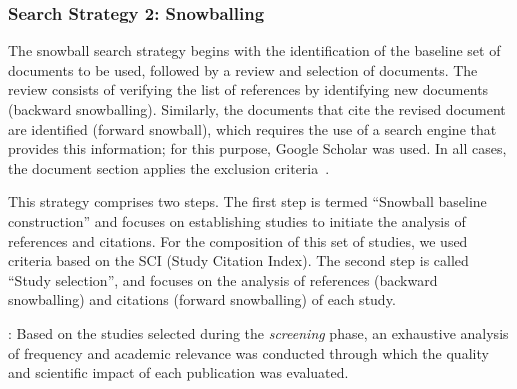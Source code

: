 \subsubsection{Search Strategy 2: Snowballing}

\newcommand{\csiSelected}{24} %
\newcommand{\newSnowballStudies}{3} %
\newcommand{\firstBackwardSnowballStudies}{3} %
\newcommand{\firstForwardSnowballStudies}{4} %
\newcommand{\secondBackwardSnowballStudies}{3} %
\newcommand{\secondForwardSnowballStudies}{5} %

\newcommand{\firstSnowballIterationStudies}{\fpeval{\firstBackwardSnowballStudies+\firstForwardSnowballStudies}}
\newcommand{\secondSnowballIterationStudies}{\fpeval{\secondBackwardSnowballStudies+\secondForwardSnowballStudies}}

\newcommand{\snowballNewStudies}{\fpeval{\firstSnowballIterationStudies+\secondSnowballIterationStudies}}




The snowball search strategy begins with the identification of the baseline set of documents to be used, followed by a review and selection of documents. The review consists of verifying the list of references by identifying new documents (backward snowballing). Similarly, the documents that cite the revised document are identified (forward snowball), which requires the use of a search engine that provides this information; for this purpose, Google Scholar was used. In all cases, the document section applies the exclusion criteria~\cite{Wohlin-01}.

This strategy comprises two steps. The first step is termed ``Snowball baseline construction'' and focuses on establishing studies to initiate the analysis of references and citations. For the composition of this set of studies, we used criteria based on the SCI (Study Citation Index). The second step is called ``Study selection'', and focuses on the analysis of references (backward snowballing) and citations (forward snowballing) of each study.


: Based on the \screenTot{} studies selected during the \textit{screening} phase, an exhaustive analysis of frequency and academic relevance was conducted through which the quality and scientific impact of each publication was evaluated.

